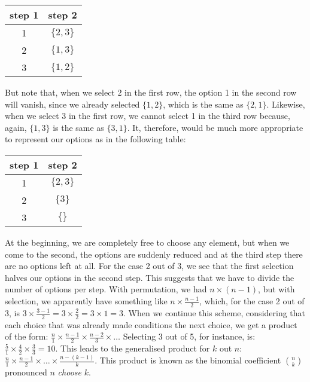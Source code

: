 \documentclass{scrreprt}
\begin{document}
\begin{center}
\begin{tabular}{ c | c }
step 1 & step 2 \\\hline 
1      & $\lbrace 2,3\rbrace$ \\ 
2      & $\lbrace 1,3\rbrace$ \\ 
3      & $\lbrace 1,2\rbrace$ 
\end{tabular}
\end{center}

But note that, when we select 2 in the first row,
the option 1 in the second row will vanish,
since we already selected $\lbrace 1,2\rbrace$,
which is the same as $\lbrace 2,1\rbrace$.
Likewise, when we select 3 in the first row,
we cannot select 1 in the third row
because, again, $\lbrace 1,3\rbrace$ is the same as
$\lbrace 3,1\rbrace$.
It, therefore, would be much more appropriate
to represent our options as in the following table:

\begin{center}
\begin{tabular}{ c | c }
step 1 & step 2 \\\hline 
1      & $\lbrace 2,3\rbrace$ \\ 
2      & $\lbrace   3\rbrace$ \\ 
3      & $\lbrace    \rbrace$ 
\end{tabular}
\end{center}

At the beginning,
we are completely free to choose
any element,
but when we come to the second,
the options are suddenly reduced
and at the third step
there are no options left at all.
For the case 2 out of 3, we see
that the first selection halves our options in the second step.
This suggests that we have to divide the number of options per step.
With permutation, we had
$n \times (n-1)$,
but with selection, we apparently have
something like $n \times \frac{n-1}{2}$,
which, for the case 2 out of 3, is 
$3 \times \frac{3-1}{2} = 3 \times \frac{2}{2} = 3 \times 1 = 3$.
When we continue this scheme,
considering that each choice that was already made
conditions the next choice,
we get a product of the form:
$\frac{n}{1} \times \frac{n-1}{2} \times \frac{n-2}{3} \times \dots$
Selecting 3 out of 5, for instance, is:
$\frac{5}{1} \times \frac{4}{2} \times \frac{3}{3} = 10$.
This leads to the generalised product for $k$ out $n$:
$\frac{n}{1} \times \frac{n-1}{2} \times \dots \times \frac{n - (k-1)}{k}$.
This product is known as the binomial coefficient $\binom{n}{k}$
pronounced $n$ \emph{choose} $k$.
\end{document}
